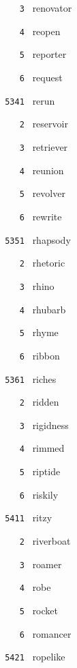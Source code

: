 \documentclass[11pt]{article}
\begin{document}
\begin{multicols}{6}
\noindent \texttt{ \ \ \ 3 } renovator  \par
\noindent \texttt{ \ \ \ 4 } reopen  \par
\noindent \texttt{ \ \ \ 5 } reporter  \par
\noindent \texttt{ \ \ \ 6 } request  \par
\vspace{3mm}
\noindent \texttt{ 5341 } rerun  \par
\noindent \texttt{ \ \ \ 2 } reservoir  \par
\noindent \texttt{ \ \ \ 3 } retriever  \par
\noindent \texttt{ \ \ \ 4 } reunion  \par
\noindent \texttt{ \ \ \ 5 } revolver  \par
\noindent \texttt{ \ \ \ 6 } rewrite  \par
\vspace{3mm}
\noindent \texttt{ 5351 } rhapsody  \par
\noindent \texttt{ \ \ \ 2 } rhetoric  \par
\noindent \texttt{ \ \ \ 3 } rhino  \par
\noindent \texttt{ \ \ \ 4 } rhubarb  \par
\noindent \texttt{ \ \ \ 5 } rhyme  \par
\noindent \texttt{ \ \ \ 6 } ribbon  \par
\vspace{3mm}
\noindent \texttt{ 5361 } riches  \par
\noindent \texttt{ \ \ \ 2 } ridden  \par
\noindent \texttt{ \ \ \ 3 } rigidness  \par
\noindent \texttt{ \ \ \ 4 } rimmed  \par
\noindent \texttt{ \ \ \ 5 } riptide  \par
\noindent \texttt{ \ \ \ 6 } riskily  \par
\noindent \texttt{ 5411 } ritzy  \par
\noindent \texttt{ \ \ \ 2 } riverboat  \par
\noindent \texttt{ \ \ \ 3 } roamer  \par
\noindent \texttt{ \ \ \ 4 } robe  \par
\noindent \texttt{ \ \ \ 5 } rocket  \par
\noindent \texttt{ \ \ \ 6 } romancer  \par
\vspace{3mm}
\noindent \texttt{ 5421 } ropelike  \par

\end{multicols}
\end{document}

